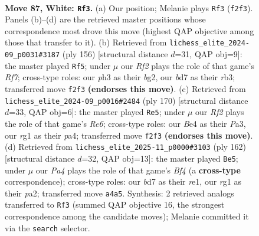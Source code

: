 \documentclass[11pt]{article}
\begin{document}
\clearpage

\begin{figure}[p]\centering
\begin{subfigure}{0.46\textwidth}\centering
\resizebox{\linewidth}{!}{%
\newchessgame
\chessboard[
  setfen={1B6/3b2k1/8/1P1N4/P3B3/3K3p/5R2/6r1 w - - 13 87},
  showmover=false,
  pgfstyle=straightmove, color=movearrow, markmove={f2-f3}
]}
\caption{}
\end{subfigure}\hfill
\begin{subfigure}{0.46\textwidth}\centering
\resizebox{\linewidth}{!}{%
\newchessgame
\chessboard[
  setfen={2k5/5R2/8/2K4p/2P4B/1r4P1/6b1/8 w - - 47 79},
  showmover=false,
  pgfstyle=straightmove, color=movearrow, markmove={f7-f5}
]}
\caption{}
\end{subfigure}
\\[4pt]
\begin{subfigure}{0.46\textwidth}\centering
\resizebox{\linewidth}{!}{%
\newchessgame
\chessboard[
  setfen={8/8/4R3/2Bp1p1b/p2P3r/P2k4/6K1/8 w - - 0 86},
  showmover=false,
  pgfstyle=straightmove, color=movearrow, markmove={e6-e5}
]}
\caption{}
\end{subfigure}\hfill
\begin{subfigure}{0.46\textwidth}\centering
\resizebox{\linewidth}{!}{%
\newchessgame
\chessboard[
  setfen={2R5/3P4/1k3b2/8/1p2PB2/1P3K2/p7/4r3 w - - 0 82},
  showmover=false,
  pgfstyle=straightmove, color=movearrow, markmove={f4-e5}
]}
\caption{}
\end{subfigure}
\caption{\textbf{Move 87, White: \texttt{Rf3}.} (a) Our position; Melanie plays \texttt{Rf3} (\texttt{f2f3}). Panels (b)--(d) are the retrieved master positions whose correspondence most drove this move (highest QAP objective among those that transfer to it). (b) Retrieved from \texttt{lichess\_elite\_2024-09\_p0031\#3187} (ply 156) [structural distance $d$=31, QAP obj=9]: the master played \texttt{Rf5}; under $\mu$ our \emph{Rf2} plays the role of that game's \emph{Rf7}; cross-type roles: our \emph{p}h3 as their \emph{b}g2, our \emph{b}d7 as their \emph{r}b3; transferred move \texttt{f2f3} \textbf{(endorses this move)}. (c) Retrieved from \texttt{lichess\_elite\_2024-09\_p0016\#2484} (ply 170) [structural distance $d$=33, QAP obj=6]: the master played \texttt{Re5}; under $\mu$ our \emph{Rf2} plays the role of that game's \emph{Re6}; cross-type roles: our \emph{B}e4 as their \emph{P}a3, our \emph{r}g1 as their \emph{p}a4; transferred move \texttt{f2f3} \textbf{(endorses this move)}. (d) Retrieved from \texttt{lichess\_elite\_2025-11\_p0000\#3103} (ply 162) [structural distance $d$=32, QAP obj=13]: the master played \texttt{Be5}; under $\mu$ our \emph{Pa4} plays the role of that game's \emph{Bf4} (a \textbf{cross-type} correspondence); cross-type roles: our \emph{b}d7 as their \emph{r}e1, our \emph{r}g1 as their \emph{p}a2; transferred move \texttt{a4a5}. Synthesis: 2 retrieved analogs transferred to \texttt{Rf3} (summed QAP objective 16, the strongest correspondence among the candidate moves); Melanie committed it via the \texttt{search} selector.}
\label{fig:thought-m172}
\end{figure}
\end{document}
